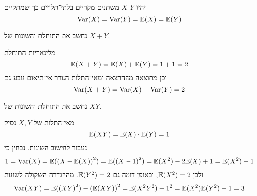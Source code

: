 \question{}
יהיו $X, Y$ משתנים מקריים בלתי־תלויים כך שמתקיים
\[
	\operatorname{Var}(X) = \operatorname{Var}(Y) = \mathbb{E}(X) = \mathbb{E}(Y)
\]

\subquestion{}
נחשב את התוחלת והשונות של $X + Y$.
\begin{solution}
	מלינאריות התוחלת
	\[
		\mathbb{E}(X + Y) = \mathbb{E}(X) + \mathbb{E}(Y) = 1 + 1 = 2
	\]
	וכן מתוצאה מההרצאה ומאי־התלות הגורר אי־תיאום נובע גם
	\[
		\operatorname{Var}(X + Y) = \operatorname{Var}(X) + \operatorname{Var}(Y) = 2
	\]
\end{solution}

\subquestion{}
נחשב את התוחלת והשונות של $XY$.
\begin{solution}
	מאי־התלות של $X, Y$ נסיק
	\[
		\mathbb{E}(XY)
		= \mathbb{E}(X) \cdot \mathbb{E}(Y)
		= 1
	\]
	נעבור לחישוב השונות.
	נבחין כי
	\[
		1 = \operatorname{Var}(X)
		= \mathbb{E}({(X - \mathbb{E}(X))}^2)
		= \mathbb{E}({(X - 1)}^2)
		= \mathbb{E}(X^2) - 2 \mathbb{E}(X) + 1
		= \mathbb{E}(X^2) - 1
	\]
	ולכן $\mathbb{E}(X^2) = 2$, ובאופן דומה גם $\mathbb{E}(Y^2) = 2$.
	מההגדרה השקולה לשונות
	\[
		\operatorname{Var}(XY)
		= \mathbb{E}({(XY)}^2) - {(\mathbb{E}(XY))}^2
		= \mathbb{E}(X^2 Y^2) - 1^2
		= \mathbb{E}(X^2) \mathbb{E}(Y^2) - 1
		= 3
	\]
\end{solution}


